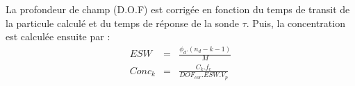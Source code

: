 La profondeur de champ (D.O.F) est corrig\'ee
en fonction du temps de transit
de la particule calcul\'e et du temps de 
r\'eponse de la sonde $\tau$. Puis, la concentration est
calcul\'ee ensuite par :   
\begin{eqnarray*}
ESW & = & \frac{\phi_d . (n_d - k - 1)}{M} \\
Conc_k & = & \frac{C_k.f_e}
                  {DOF_{cor}.ESW.V_p}
\end{eqnarray*}
